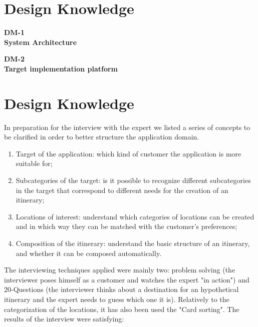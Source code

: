\documentclass[11pt]{article} %
\def\worksheet#1#2{%
  \clearpage
  
  \begin{center}
  {\large\bf #1} \\
  {\normalsize\bf #2} \\[12pt]
  \begin{footnotesize}
  
  \end{footnotesize}
  \end{center}  
  \vfill}
\renewcommand\appendix{\par
  \setcounter{section}{0}
  \setcounter{subsection}{0}
  \setcounter{figure}{0}
  \setcounter{table}{0}
  \renewcommand\thesection{Appendix \Alph{section}}
  \renewcommand\thefigure{\Alph{section}\arabic{figure}}
  \renewcommand\thetable{\Alph{section}\arabic{table}}
}
\begin{document}
\section{Design Knowledge}

\worksheet{DM-1}{System Architecture}

\worksheet{DM-2}{Target implementation platform}

\appendix
\section{Design Knowledge}

In preparation for the interview with the expert we listed a series of concepts to be clarified in order to better structure the application domain. 

\begin{enumerate}
  \item Target of the application: which kind of customer the application is more suitable for;
  \item Subcategories of the target: is it possible to recognize different subcategories in the target that correspond to different needs for the creation of an itinerary;
  \item Locations of interest: understand which categories of locations can be created and in which way they can be matched with the customer's preferences;
  \item Composition of the itinerary: understand the basic structure of an itinerary, and whether it can be composed automatically.
\end{enumerate}

The interviewing techniques applied were mainly two: problem solving (the interviewer poses himself as a customer and watches the expert "in action") and 20-Questions (the interviewer thinks about a destination for an hypothetical itinerary and the expert needs to guess which one it is). Relatively to the categorization of the locations, it has also been used the "Card sorting".
The results of the interview were satisfying:
\end{document}
